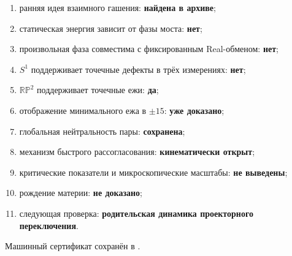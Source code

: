 \begin{protocol}
\begin{enumerate}
 \item ранняя идея взаимного гашения: \textbf{найдена в архиве};
 \item статическая энергия зависит от фазы моста: \textbf{нет};
 \item произвольная фаза совместима с фиксированным Real-обменом:
 \textbf{нет};
 \item $S^1$ поддерживает точечные дефекты в трёх измерениях:
 \textbf{нет};
 \item $\mathbb{RP}^2$ поддерживает точечные ежи: \textbf{да};
 \item отображение минимального ежа в $\pm15$: \textbf{уже доказано};
 \item глобальная нейтральность пары: \textbf{сохранена};
 \item механизм быстрого рассогласования: \textbf{кинематически открыт};
 \item критические показатели и микроскопические масштабы:
 \textbf{не выведены};
 \item рождение материи: \textbf{не доказано};
 \item следующая проверка:
 \textbf{родительская динамика проекторного переключения}.
\end{enumerate}
\end{protocol}

Машинный сертификат сохранён в
.